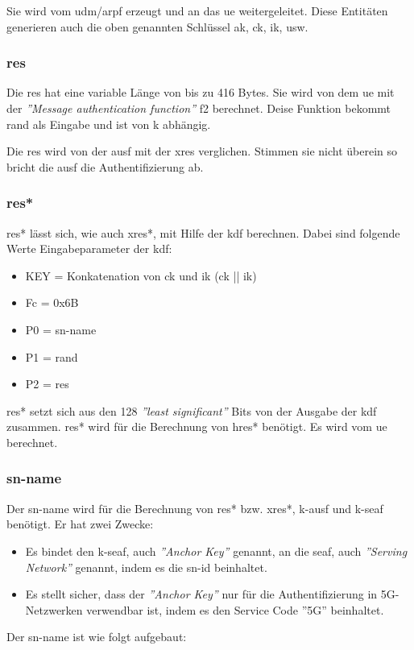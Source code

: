 Sie wird vom \gls{udm}/\gls{arpf} erzeugt und an das \gls{ue} weitergeleitet. Diese Entit\"aten generieren auch die oben genannten Schl\"ussel \gls{ak}, \gls{ck}, \gls{ik}, usw.

\subsubsection{\gls{res}}
Die \gls{res} hat eine variable L\"ange von bis zu 416 Bytes. %
Sie wird von dem \gls{ue} mit der \textit{''Message authentication function''} f2 berechnet.
Deise Funktion bekommt \gls{rand} als Eingabe und ist von \gls{k} abh\"angig. %

Die \gls{res} wird von der \gls{ausf} mit der \gls{xres} verglichen.
Stimmen sie nicht \"uberein so bricht die \gls{ausf} die Authentifizierung ab. %

\subsubsection{\gls{res*}}
\gls{res*} l\"asst sich, wie auch \gls{xres*}, mit Hilfe der \gls{kdf} berechnen.
Dabei sind folgende Werte Eingabeparameter der \gls{kdf}: %
\begin{itemize}
\item KEY = Konkatenation von \gls{ck} und \gls{ik} (\gls{ck} || \gls{ik})
\item Fc = 0x6B
\item P0 = \gls{sn-name}
\item P1 = \gls{rand}
\item P2 = \gls{res}
\end{itemize}

\gls{res*} setzt sich aus den 128 \textit{''least significant''} Bits von der Ausgabe der \gls{kdf} zusammen.
\gls{res*} wird f\"ur die Berechnung von \gls{hres*} ben\"otigt.
Es wird vom \gls{ue} berechnet.

\subsubsection{\gls{sn-name}}
Der \gls{sn-name} wird f\"ur die Berechnung von \gls{res*} bzw. \gls{xres*}, \gls{k-ausf} und \gls{k-seaf} ben\"otigt.
Er hat zwei Zwecke: %
\begin{itemize}
\item Es bindet den \gls{k-seaf}, auch  \textit{''Anchor Key''}  genannt, an die \gls{seaf}, auch \textit{''Serving Network''} genannt, indem es die \gls{sn-id} beinhaltet.
\item Es stellt sicher, dass der \textit{''Anchor Key''} nur f\"ur die Authentifizierung in 5G-Netzwerken verwendbar ist, indem es den Service Code ''5G'' beinhaltet.
\end{itemize}
Der \gls{sn-name} ist wie folgt aufgebaut: %

